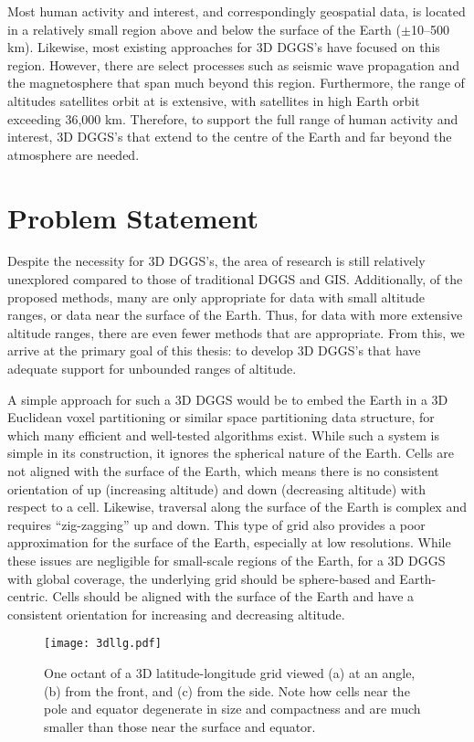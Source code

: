 Most human activity and interest, and correspondingly geospatial data, is located in a relatively small region above and below the surface of the Earth ($\pm$10--500 km).
Likewise, most existing approaches for 3D DGGS's have focused on this region.
However, there are select processes such as seismic wave propagation and the magnetosphere that span much beyond this region.
Furthermore, the range of altitudes satellites orbit at is extensive, with satellites in high Earth orbit exceeding 36,000 km.
Therefore, to support the full range of human activity and interest, 3D DGGS's that extend to the centre of the Earth and far beyond the atmosphere are needed.


\section{Problem Statement} \label{chap:1:problem}
Despite the necessity for 3D DGGS's, the area of research is still relatively unexplored compared to those of traditional DGGS and GIS.
Additionally, of the proposed methods, many are only appropriate for data with small altitude ranges, or data near the surface of the Earth.
Thus, for data with more extensive altitude ranges, there are even fewer methods that are appropriate. 
From this, we arrive at the primary goal of this thesis: to develop 3D DGGS's that have adequate support for unbounded ranges of altitude. 


A simple approach for such a 3D DGGS would be to embed the Earth in a 3D Euclidean voxel partitioning or similar space partitioning data structure, for which many efficient and well-tested algorithms exist.
While such a system is simple in its construction, it ignores the spherical nature of the Earth.
Cells are not aligned with the surface of the Earth, which means there is no consistent orientation of up (increasing altitude) and down (decreasing altitude) with respect to a cell.
Likewise, traversal along the surface of the Earth is complex and requires ``zig-zagging'' up and down.
This type of grid also provides a poor approximation for the surface of the Earth, especially at low resolutions.
While these issues are negligible for small-scale regions of the Earth, for a 3D DGGS with global coverage, the underlying grid should be sphere-based and Earth-centric.
Cells should be aligned with the surface of the Earth and have a consistent orientation for increasing and decreasing altitude.


\begin{figure}[ht!]
	\centering
	\texttt{[image: 3dllg.pdf]}
	\caption[Different views of a 3D latitude-longitude grid]{
		One octant of a 3D latitude-longitude grid viewed (a) at an angle, (b) from the front, and (c) from the side.
		Note how cells near the pole and equator degenerate in size and compactness and are much smaller than those near the surface and equator.
	}
	\label{fig:3dllg}
\end{figure}

